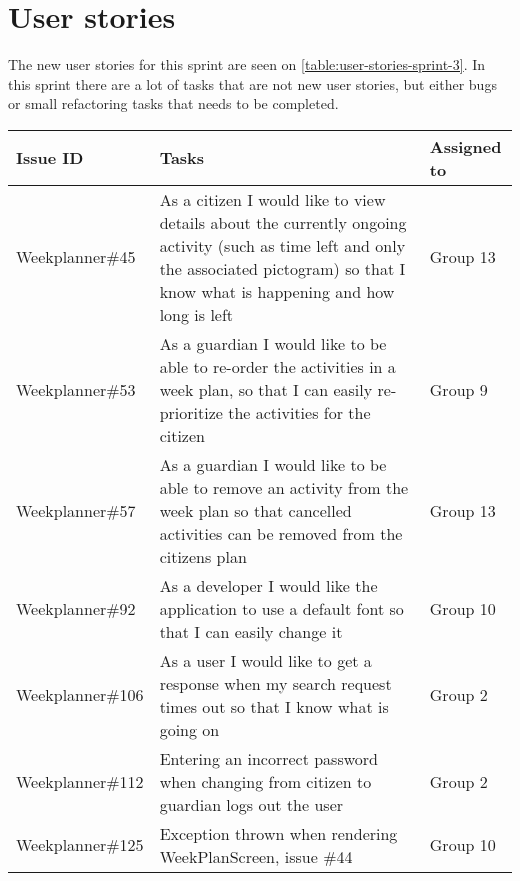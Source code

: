 \section{User stories}
The new user stories for this sprint are seen on \autoref{table:user-stories-sprint-3}.
In this sprint there are a lot of tasks that are not new user stories, but either bugs or small refactoring tasks that needs to be completed.

\begin{longtable}{|p{2.8cm}|p{8cm}|p{2cm}|}
    \hline
    Issue ID        & Tasks                                                                                                                                                                             & Assigned to      \\ \hline
    Weekplanner\#45 & As a citizen I would like to view details about the currently ongoing activity (such as time left and only the associated pictogram) so that I know what is happening and how long is left & Group 13            \\ \hline
    Weekplanner\#53 & As a guardian I would like to be able to re-order the activities in a week plan, so that I can easily re-prioritize the activities for the citizen                                      & Group 9           \\ \hline
    Weekplanner\#57 & As a guardian I would like to be able to remove an activity from the week plan so that cancelled activities can be removed from the citizens plan                                    & Group 13           \\ \hline
    Weekplanner\#92 & As a developer I would like the application to use a default font so that I can easily change it                                                                                       & Group 10           \\ \hline
    Weekplanner\#106 & As a user I would like to get a response when my search request times out so that I know what is going on                                                                             & Group 2           \\ \hline
    Weekplanner\#112 & Entering an incorrect password when changing from citizen to guardian logs out the user                                                                                                  & Group 2          \\ \hline
    Weekplanner\#125 & Exception thrown when rendering WeekPlanScreen, issue \#44                                                                                                                             & Group 10           \\ \hline

\end{longtable}

